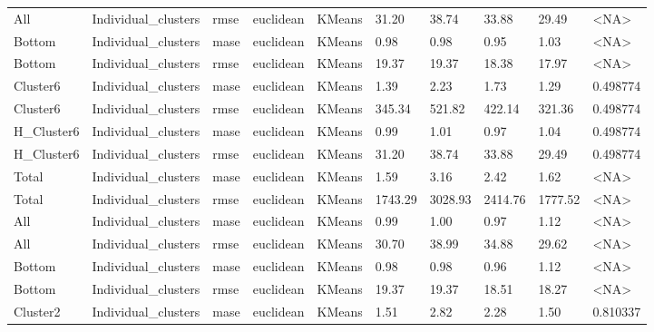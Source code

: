 \begin{tabular}{llllllllll}
        All & Individual\_clusters &   rmse &  euclidean &        KMeans &   31.20 &    38.74 &                 33.88 &         29.49 &      <NA> \\
     Bottom & Individual\_clusters &   mase &  euclidean &        KMeans &    0.98 &     0.98 &                  0.95 &          1.03 &      <NA> \\
     Bottom & Individual\_clusters &   rmse &  euclidean &        KMeans &   19.37 &    19.37 &                 18.38 &         17.97 &      <NA> \\
   Cluster6 & Individual\_clusters &   mase &  euclidean &        KMeans &    1.39 &     2.23 &                  1.73 &          1.29 &  0.498774 \\
   Cluster6 & Individual\_clusters &   rmse &  euclidean &        KMeans &  345.34 &   521.82 &                422.14 &        321.36 &  0.498774 \\
 H\_Cluster6 & Individual\_clusters &   mase &  euclidean &        KMeans &    0.99 &     1.01 &                  0.97 &          1.04 &  0.498774 \\
 H\_Cluster6 & Individual\_clusters &   rmse &  euclidean &        KMeans &   31.20 &    38.74 &                 33.88 &         29.49 &  0.498774 \\
      Total & Individual\_clusters &   mase &  euclidean &        KMeans &    1.59 &     3.16 &                  2.42 &          1.62 &      <NA> \\
      Total & Individual\_clusters &   rmse &  euclidean &        KMeans & 1743.29 &  3028.93 &               2414.76 &       1777.52 &      <NA> \\
        All & Individual\_clusters &   mase &  euclidean &        KMeans &    0.99 &     1.00 &                  0.97 &          1.12 &      <NA> \\
        All & Individual\_clusters &   rmse &  euclidean &        KMeans &   30.70 &    38.99 &                 34.88 &         29.62 &      <NA> \\
     Bottom & Individual\_clusters &   mase &  euclidean &        KMeans &    0.98 &     0.98 &                  0.96 &          1.12 &      <NA> \\
     Bottom & Individual\_clusters &   rmse &  euclidean &        KMeans &   19.37 &    19.37 &                 18.51 &         18.27 &      <NA> \\
   Cluster2 & Individual\_clusters &   mase &  euclidean &        KMeans &    1.51 &     2.82 &                  2.28 &          1.50 &  0.810337 \\

\end{tabular}
